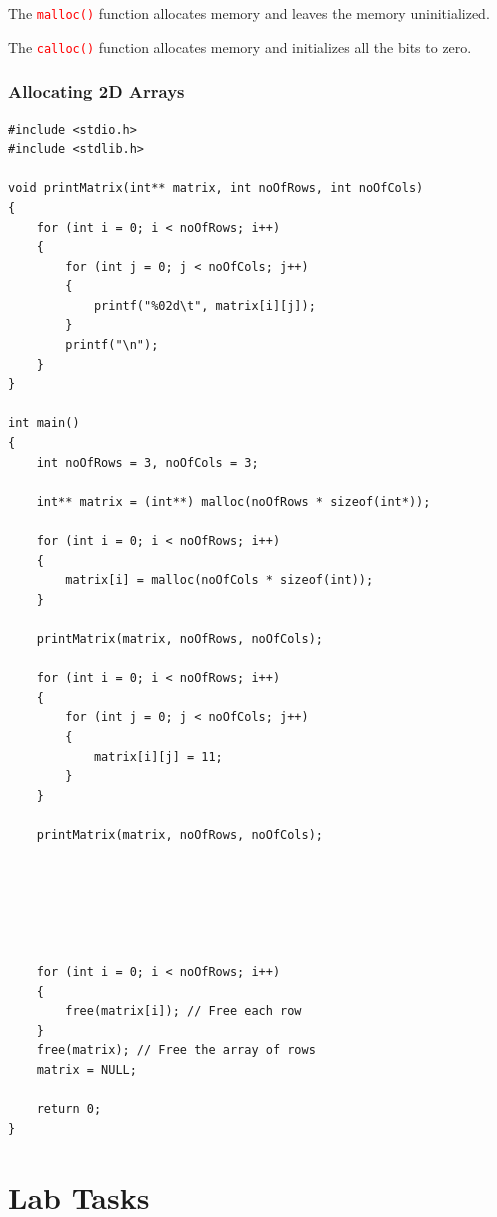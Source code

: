 \documentclass[12pt]{article}
\begin{document}
\noindent The \textcolor{red}{\texttt{malloc()}} function allocates memory and leaves the memory uninitialized. 

\noindent The \textcolor{red}{\texttt{calloc()}} function allocates memory and initializes all the bits to zero. \\

\newpage
{}
\section*{Allocating 2D Arrays}

\begin{verbatim}
#include <stdio.h>
#include <stdlib.h>

void printMatrix(int** matrix, int noOfRows, int noOfCols)
{
    for (int i = 0; i < noOfRows; i++)
    {
        for (int j = 0; j < noOfCols; j++)
        {
            printf("%02d\t", matrix[i][j]);
        }
        printf("\n");
    }
}

int main()
{
    int noOfRows = 3, noOfCols = 3;

    int** matrix = (int**) malloc(noOfRows * sizeof(int*));

    for (int i = 0; i < noOfRows; i++)
    {
        matrix[i] = malloc(noOfCols * sizeof(int));
    }

    printMatrix(matrix, noOfRows, noOfCols);

    for (int i = 0; i < noOfRows; i++)
    {
        for (int j = 0; j < noOfCols; j++)
        {
            matrix[i][j] = 11;
        }
    }

    printMatrix(matrix, noOfRows, noOfCols);






    for (int i = 0; i < noOfRows; i++)
    {
        free(matrix[i]); // Free each row
    }
    free(matrix); // Free the array of rows
    matrix = NULL;

    return 0;
}
\end{verbatim}






\newpage
{}
\part*{\centering Lab Tasks}
\end{document}
